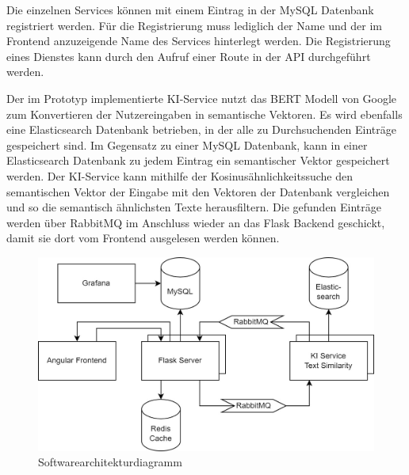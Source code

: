 Die einzelnen Services können mit einem Eintrag in der MySQL Datenbank registriert werden. Für die Registrierung muss lediglich der Name und der im Frontend anzuzeigende Name des Services hinterlegt werden. Die Registrierung eines Dienstes kann durch den Aufruf einer Route in der API durchgeführt werden. 

Der im Prototyp implementierte KI-Service nutzt das BERT Modell von Google zum Konvertieren der Nutzereingaben in semantische Vektoren. Es wird ebenfalls eine Elasticsearch Datenbank betrieben, in der alle zu Durchsuchenden Einträge gespeichert sind. Im Gegensatz zu einer MySQL Datenbank, kann in einer Elasticsearch Datenbank zu jedem Eintrag ein semantischer Vektor gespeichert werden. Der KI-Service kann mithilfe der Kosinusähnlichkeitssuche den semantischen Vektor der Eingabe mit den Vektoren der Datenbank vergleichen und so die semantisch ähnlichsten Texte herausfiltern. Die gefunden Einträge werden über RabbitMQ im Anschluss wieder an das Flask Backend geschickt, damit sie dort vom Frontend ausgelesen werden können.

\begin{figure}[H]
  \centering
    \includegraphics[width = 12cm]{bilder/Architektur}
    \caption{Softwarearchitekturdiagramm}
\end{figure}

